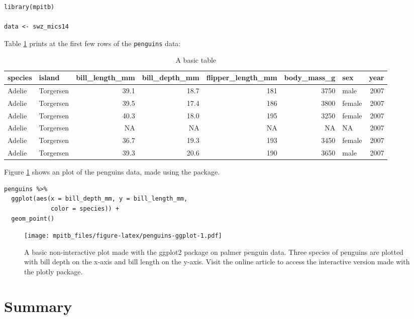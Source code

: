 \begin{verbatim}
library(mpitb)

data <- swz_mics14
\end{verbatim}

Table \ref{tab:penguins-tab-static} prints at the first few rows of the \texttt{penguins} data:

\begin{table}

\caption{\label{tab:penguins-tab-static}A basic table}
\centering
\fontsize{7}{9}\selectfont
\begin{tabular}[t]{l|l|r|r|r|r|l|r}
\hline
species & island & bill\_length\_mm & bill\_depth\_mm & flipper\_length\_mm & body\_mass\_g & sex & year\\
\hline
Adelie & Torgersen & 39.1 & 18.7 & 181 & 3750 & male & 2007\\
\hline
Adelie & Torgersen & 39.5 & 17.4 & 186 & 3800 & female & 2007\\
\hline
Adelie & Torgersen & 40.3 & 18.0 & 195 & 3250 & female & 2007\\
\hline
Adelie & Torgersen & NA & NA & NA & NA & NA & 2007\\
\hline
Adelie & Torgersen & 36.7 & 19.3 & 193 & 3450 & female & 2007\\
\hline
Adelie & Torgersen & 39.3 & 20.6 & 190 & 3650 & male & 2007\\
\hline
\end{tabular}
\end{table}

Figure \ref{fig:penguins-ggplot} shows an plot of the penguins data, made using the  package.

\begin{verbatim}
penguins %>% 
  ggplot(aes(x = bill_depth_mm, y = bill_length_mm, 
             color = species)) + 
  geom_point()
\end{verbatim}

\begin{figure}
\centering
\texttt{[image: mpitb\_files/figure-latex/penguins-ggplot-1.pdf]}
\caption{\label{fig:penguins-ggplot}A basic non-interactive plot made with the ggplot2 package on palmer penguin data. Three species of penguins are plotted with bill depth on the x-axis and bill length on the y-axis. Visit the online article to access the interactive version made with the plotly package.}
\end{figure}

\hypertarget{summary}{%
\section{Summary}\label{summary}}

